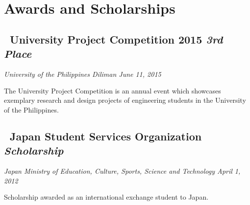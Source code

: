 \section*{Awards and Scholarships}

\subsection*{{\color{special-color}\faTrophy \  University Project Competition 2015 \hfill \textnormal{\emph{3rd Place}}}}
\begin{description}
  \item \emph{University of the Philippines Diliman \hfill {\color{gray}June 11, 2015}}
  \item The University Project Competition is an annual event which showcases exemplary research and design projects of engineering students in the University of the Philippines.
\end{description}

\subsection*{{\color{special-color}\faTrophy \  Japan Student Services Organization \hfill \textnormal{\emph{Scholarship}}}}
\begin{description}
  \item \emph{Japan Ministry of Education, Culture, Sports, Science and Technology \hfill {\color{gray}April 1, 2012}}
  \item Scholarship awarded as an international exchange student to Japan.
\end{description}


